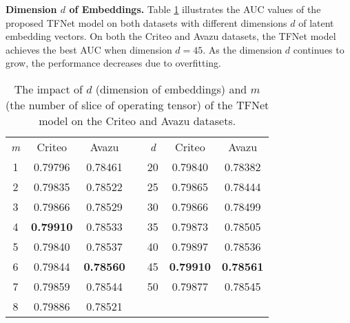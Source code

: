 \documentclass[sigconf]{acmart}
\begin{document}
\textbf{Dimension $d$ of Embeddings.}  Table \ref{hyper} illustrates the AUC values of the proposed TFNet model on both datasets with different dimensions $d$ of latent embedding vectors. On both the Criteo and Avazu datasets, the TFNet model achieves the best AUC when dimension $d=45$. 
As the dimension $d$ continues to grow, the performance decreases due to overfitting. 



\begin{table}[]
\small
\centering
  \caption{The impact of $d$ (dimension of embeddings) and $m$ (the number of slice of operating tensor) of the TFNet model on the Criteo and Avazu datasets.}
\begin{tabular}{|c|c|c|cccc}
\cline{1-3} \cline{5-7}
\textit{m} & Criteo  & Avazu   & \multicolumn{1}{c|}{} & \multicolumn{1}{c|}{\textit{d}} & \multicolumn{1}{c|}{Criteo}  & \multicolumn{1}{c|}{Avazu}   \\ \cline{1-3} \cline{5-7} 
1          & 0.79796 & 0.78461 & \multicolumn{1}{c|}{} & \multicolumn{1}{c|}{20}         & \multicolumn{1}{c|}{0.79840} & \multicolumn{1}{c|}{0.78382} \\ \cline{1-3} \cline{5-7} 
2          & 0.79835 & 0.78522 & \multicolumn{1}{c|}{} & \multicolumn{1}{c|}{25}         & \multicolumn{1}{c|}{0.79865} & \multicolumn{1}{c|}{0.78444} \\ \cline{1-3} \cline{5-7} 
3          & 0.79866 & 0.78529 & \multicolumn{1}{c|}{} & \multicolumn{1}{c|}{30}         & \multicolumn{1}{c|}{0.79866} & \multicolumn{1}{c|}{0.78499} \\ \cline{1-3} \cline{5-7} 
4          & \textbf{0.79910} & 0.78533 & \multicolumn{1}{c|}{} & \multicolumn{1}{c|}{35}         & \multicolumn{1}{c|}{0.79873} & \multicolumn{1}{c|}{0.78505} \\ \cline{1-3} \cline{5-7} 
5          & 0.79840 & 0.78537 & \multicolumn{1}{c|}{} & \multicolumn{1}{c|}{40}         & \multicolumn{1}{c|}{0.79897} & \multicolumn{1}{c|}{0.78536} \\ \cline{1-3} \cline{5-7} 
6          & 0.79844 & \textbf{0.78560} & \multicolumn{1}{c|}{} & \multicolumn{1}{c|}{45}         & \multicolumn{1}{c|}{\textbf{0.79910}} & \multicolumn{1}{c|}{\textbf{0.78561}} \\ \cline{1-3} \cline{5-7} 
7          & 0.79859 & 0.78544 & \multicolumn{1}{c|}{} & \multicolumn{1}{c|}{50}         & \multicolumn{1}{c|}{0.79877} & \multicolumn{1}{c|}{0.78545} \\ \cline{1-3} \cline{5-7} 
8          & 0.79886 & 0.78521 &                       &                                 &                              &                              \\ \cline{1-3}
\end{tabular}
\label{hyper}
\end{table}
\end{document}
